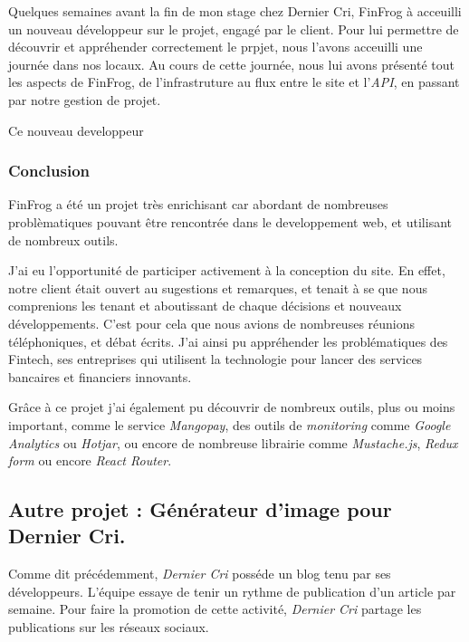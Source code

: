 Quelques semaines avant la fin de mon stage chez Dernier Cri, FinFrog à
acceuilli un nouveau développeur sur le projet, engagé par le client.
Pour lui permettre de découvrir et appréhender correctement le prpjet,
nous l'avons acceuilli une journée dans nos locaux. Au cours de cette
journée, nous lui avons présenté tout les aspects de FinFrog, de
l'infrastruture au flux entre le site et l'\emph{API}, en passant par
notre gestion de projet.

\bigskip

Ce nouveau developpeur

\subsubsection{Conclusion}\label{conclusion-1}

FinFrog a été un projet très enrichisant car abordant de nombreuses
problèmatiques pouvant être rencontrée dans le developpement web, et
utilisant de nombreux outils.

\bigskip

J'ai eu l'opportunité de participer activement à la conception du site.
En effet, notre client était ouvert au sugestions et remarques, et
tenait à se que nous comprenions les tenant et aboutissant de chaque
décisions et nouveaux développements. C'est pour cela que nous avions de
nombreuses réunions téléphoniques, et débat écrits. J'ai ainsi pu
appréhender les problématiques des Fintech, ses entreprises qui
utilisent la technologie pour lancer des services bancaires et
financiers innovants.

\bigskip

Grâce à ce projet j'ai également pu découvrir de nombreux outils, plus
ou moins important, comme le service \emph{Mangopay}, des outils de
\emph{monitoring} comme \emph{Google Analytics} ou \emph{Hotjar}, ou
encore de nombreuse librairie comme \emph{Mustache.js}, \emph{Redux
form} ou encore \emph{React Router}.

\bigskip

\subsection{Autre projet : Générateur d'image pour Dernier
Cri.}\label{autre-projet-guxe9nuxe9rateur-dimage-pour-dernier-cri.}

\bigskip

Comme dit précédemment, \emph{Dernier Cri} posséde un blog tenu par ses
développeurs. L'équipe essaye de tenir un rythme de publication d'un
article par semaine. Pour faire la promotion de cette activité,
\emph{Dernier Cri} partage les publications sur les réseaux sociaux.

